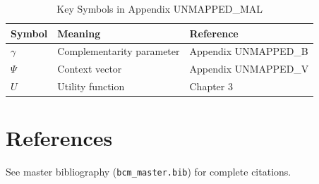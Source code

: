 \begin{table}[htbp]
\centering
\caption{Key Symbols in Appendix UNMAPPED_MAL}
\begin{tabular}{lll}
\toprule
\textbf{Symbol} & \textbf{Meaning} & \textbf{Reference} \\
\midrule
$\gamma$ & Complementarity parameter & Appendix UNMAPPED_B \\
$\Psi$ & Context vector & Appendix UNMAPPED_V \\
$U$ & Utility function & Chapter 3 \\
\bottomrule
\end{tabular}
\end{table}


\section{References}
\label{sec:mal-references}

See master bibliography (\texttt{bcm\_master.bib}) for complete citations.

\nocite{bcm_master}

